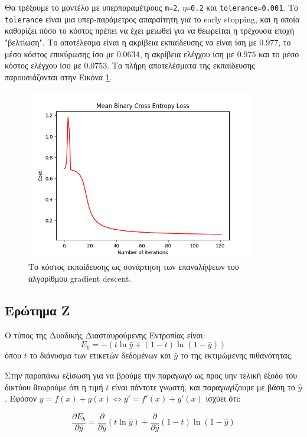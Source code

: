 \documentclass{article}
\newcommand{\code}{\texttt}
\begin{document}
Θα τρέξουμε το μοντέλο με υπερπαραμέτρους \code{m=2}, \code{$\eta$=0.2} και \code{tolerance=0.001}. Το \code{tolerance} είναι μια υπερ-παράμετρος απαραίτητη για το early stopping, και η οποία καθορίζει πόσο το κόστος πρέπει να έχει μειωθεί για να θεωρείται η τρέχουσα εποχή "βελτίωση". Το αποτέλεσμα είναι η ακρίβεια εκπαίδευσης να είναι ίση με $0.977$, το μέσο κόστος επικύρωσης ίσο με $0.0634$, η ακρίβεια ελέγχου ίση με $0.975$ και το μέσο κόστος ελέγχου ίσο με $0.0753$. Τα πλήρη αποτελέσματα της εκπαίδευσης παρουσιάζονται στην Εικόνα \ref{mlp_train_test}.

\begin{figure}
	\includegraphics[width=10cm]{mlp_error.png}
	\centering
	\caption{Το κόστος εκπαίδευσης ως συνάρτηση των επαναλήψεων του αλγορίθμου gradient descent.}
	\label{mlp_train_test}
\end{figure}


\subsection{Ερώτημα Ζ}

Ο τύπος της Δυαδικής Διασταυρούμενης Εντροπίας είναι:
\begin{equation}
	\label{eq:1}
	E_{b} = -(t \ln \hat{y} + (1-t) \ln(1-\hat{y}))
\end{equation}
όπου $t$ το διάνυσμα των ετικετών δεδομένων και $\hat{y}$ το της εκτιμώμενης πιθανότητας.

Στην παραπάνω εξίσωση για να βρούμε την παραγωγό ως προς υην τελική έξοδο του δικτύου θεωρούμε ότι η τιμή $t$ είναι πάντοτε γνωστή, και παραγωγίζουμε με βάση το $\hat{y}$. Εφόσον $y = f(x) + g(x) \iff y' = f'(x) + g'(x)$ ισχύει ότι:

\begin{equation}
	\label{eq:2}
	\frac{\partial E_b}{\partial \hat{y}} = \frac{\partial}{\partial \hat{y}} (t\ln \hat{y}) + \frac{\partial}{\partial \hat{y}} (1-t) \ln (1-\hat{y})
\end{equation}
\end{document}
